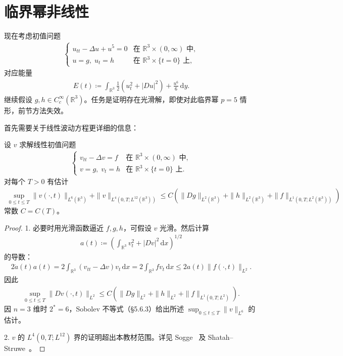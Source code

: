 \documentclass[../../main.tex]{subfiles}
\begin{document}
\section{临界幂非线性}\label{section:ch12-临界幂非线性}

现在考虑初值问题
\begin{align}
\begin{cases}
u_{tt}-\Delta u+u^5=0 & \text{在 } \mathbb{R}^3\times(0,\infty) \text{ 中},\\
u=g,\;u_t=h & \text{在 } \mathbb{R}^3\times\{t=0\} \text{ 上},
\end{cases}
\label{align:ch12-临界初值}
\end{align}
对应能量
\begin{align}
E(t)\coloneqq\int_{\mathbb{R}^3}\frac{1}{2}(u_t^2+|Du|^2)+\frac{u^6}{6}\,\mathrm{d}y.
\label{align:ch12-临界能量}
\end{align}
继续假设 $g,h\in C_c^\infty(\mathbb{R}^3)$。任务是证明存在光滑解，即使对此临界幂 $p=5$ 情形，前节方法失效。

首先需要关于线性波动方程更详细的信息：

\begin{theorem}[三维波动方程的估计。]\label{theorem:ch12-三维波动估计}设 $v$ 求解线性初值问题
\begin{align}
\begin{cases}
v_{tt}-\Delta v=f & \text{在 } \mathbb{R}^3\times(0,\infty) \text{ 中},\\
v=g,\;v_t=h & \text{在 } \mathbb{R}^3\times\{t=0\} \text{ 上}.
\end{cases}
\label{align:ch12-线性波动}
\end{align}
对每个 $T>0$ 有估计
\begin{align}
\sup_{0\leqslant t\leqslant T}\|v(\cdot,t)\|_{L^6(\mathbb{R}^3)}+\|v\|_{L^4(0,T;L^{12}(\mathbb{R}^3))}\leqslant C(\|Dg\|_{L^2(\mathbb{R}^3)}+\|h\|_{L^2(\mathbb{R}^3)}+\|f\|_{L^1(0,T;L^2(\mathbb{R}^3))})
\label{align:ch12-波动估计}
\end{align}
常数 $C=C(T)$。
\end{theorem}

\begin{proof}
1. 必要时用光滑函数逼近 $f,g,h$，可假设 $v$ 光滑。然后计算
\begin{align*}
a(t)\coloneqq\left(\int_{\mathbb{R}^3}v_t^2+|Dv|^2\,\mathrm{d}x\right)^{1/2}
\end{align*}
的导数：
\begin{align*}
2\dot{a}(t)a(t)=2\int_{\mathbb{R}^3}(v_{tt}-\Delta v)v_t\,\mathrm{d}x=2\int_{\mathbb{R}^3}fv_t\,\mathrm{d}x\leqslant 2a(t)\|f(\cdot,t)\|_{L^2}.
\end{align*}
因此
\begin{align*}
\sup_{0\leqslant t\leqslant T}\|Dv(\cdot,t)\|_{L^2}\leqslant C(\|Dg\|_{L^2}+\|h\|_{L^2}+\|f\|_{L^1(0,T;L^2)}).
\end{align*}
因 $n=3$ 维时 $2^*=6$，Sobolev 不等式（\S5.6.3）给出所述 $\sup_{0\leqslant t\leqslant T}\|v\|_{L^6}$ 的估计。

2. $v$ 的 $L^4(0,T;L^{12})$ 界的证明超出本教材范围。详见 Sogge~\cite{So} 及 Shatah--Struwe~\cite{S-S}。
\end{proof}
\end{document}
